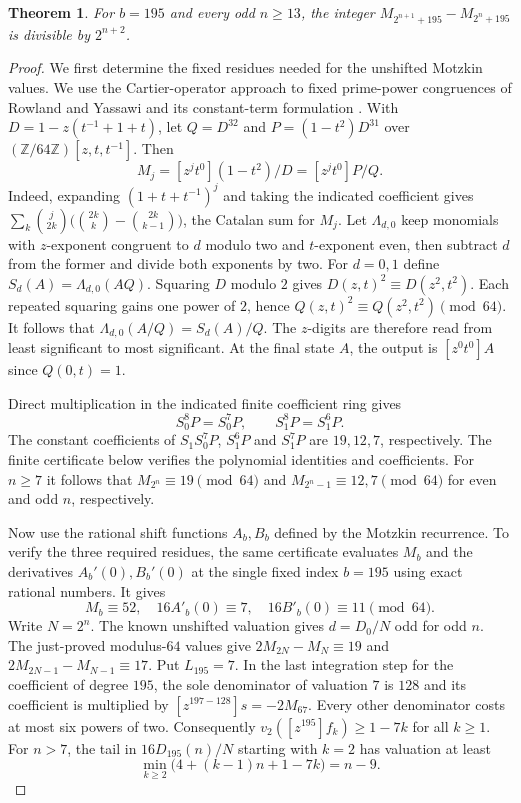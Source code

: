 \documentclass[11pt,a4paper]{article}
\newtheorem{theorem}{Theorem}[section]
\begin{document}
\begin{theorem}
For $b=195$ and every odd $n\ge13$, the integer
$M_{2^{n+1}+195}-M_{2^n+195}$ is divisible by $2^{n+2}$.
\end{theorem}

\begin{proof}
We first determine the fixed residues needed for the unshifted Motzkin
values. We use the Cartier-operator approach to fixed prime-power congruences
of Rowland and Yassawi and its constant-term formulation
\cite{ry,straub}. With $D=1-z(t^{-1}+1+t)$, let $Q=D^{32}$ and
$P=(1-t^2)D^{31}$ over $(\mathbb Z/64\mathbb Z)[z,t,t^{-1}]$.
Then
\[
 M_j=[z^jt^0](1-t^2)/D=[z^jt^0]P/Q.
\]
Indeed, expanding $(1+t+t^{-1})^j$ and taking the indicated
coefficient gives $\sum_k\binom j{2k}\bigl(\binom{2k}k-
\binom{2k}{k-1}\bigr)$, the Catalan sum for $M_j$.
Let $\Lambda_{d,0}$ keep monomials with $z$-exponent congruent to $d$
modulo two and $t$-exponent even, then subtract $d$ from the former and divide both
exponents by two. For $d=0,1$ define $S_d(A)=\Lambda_{d,0}(AQ)$.
Squaring $D$ modulo $2$ gives $D(z,t)^2\equiv D(z^2,t^2)$.
Each repeated squaring gains one power of $2$, hence
$Q(z,t)^2\equiv Q(z^2,t^2)\pmod{64}$. It follows that
$\Lambda_{d,0}(A/Q)=S_d(A)/Q$. The $z$-digits are therefore read from
least significant to most significant. At the final state $A$, the
output is $[z^0t^0]A$ since $Q(0,t)=1$.

Direct multiplication in the indicated finite coefficient ring gives
\[
 S_0^8P=S_0^7P,\qquad S_1^8P=S_1^6P .
\]
The constant coefficients of $S_1 S_0^7 P$, $S_1^6P$ and $S_1^7 P$
are $19,12,7$, respectively. The finite certificate below verifies
the polynomial identities and coefficients. For $n\ge7$ it follows
that $M_{2^n}\equiv19\pmod{64}$ and
$M_{2^n-1}\equiv12,7\pmod{64}$ for even and odd $n$, respectively.

Now use the rational shift functions $A_b,B_b$ defined by the
Motzkin recurrence. To verify the three required residues, the same
certificate evaluates $M_b$ and the derivatives $A_b'(0),B_b'(0)$
at the single fixed index $b=195$ using exact rational numbers. It gives
\[
 M_b\equiv52,\quad 16A'_b(0)\equiv7,\quad
 16B'_b(0)\equiv11\pmod{64}.
\]
Write $N=2^n$. The known unshifted valuation gives $d=D_0/N$ odd
for odd $n$. The just-proved modulus-$64$ values give
$2M_{2N}-M_N\equiv19$ and $2M_{2N-1}-M_{N-1}\equiv17$.
Put $L_{195}=7$. In the last integration step for the coefficient
of degree $195$, the sole denominator of valuation $7$ is $128$ and
its coefficient is multiplied by $[z^{197-128}]s=-2M_{67}$.
Every other denominator costs at most six powers of two. Consequently
$v_2([z^{195}]f_k)\ge1-7k$ for all $k\ge1$. For $n>7$, the tail in
$16D_{195}(n)/N$ starting with $k=2$ has valuation at least
\[
 \min_{k\ge2}\bigl(4+(k-1)n+1-7k\bigr)=n-9 .
\]


\end{proof}
\end{document}
